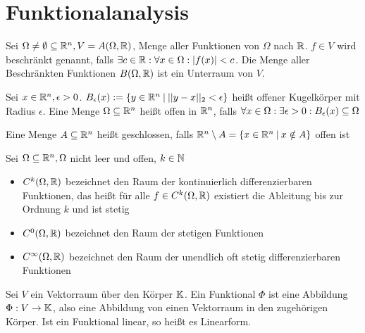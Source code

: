 \section{Funktionalanalysis}

\begin{definition}
	Sei $ \Omega \neq \emptyset \subseteq \mathbb{R}^n, V = A(\Omega,\mathbb{R})$, Menge aller Funktionen von $\Omega$ nach $\mathbb{R}$. $f \in V$ wird beschränkt genannt, falls $\exists c \in \mathbb{R} : \forall x \in \Omega : |f(x)| < c$. Die Menge aller Beschränkten Funktionen  $B(\Omega,\mathbb{R})$ ist ein Unterraum von $V$.
\end{definition}

\begin{definition}
	Sei $x \in \mathbb{R}^n, \epsilon > 0$. $B_\epsilon(x) := \{y \in \mathbb{R}^n \medspace | \medspace ||y-x||_2 < \epsilon \}$ heißt offener Kugelkörper mit Radius $\epsilon$. Eine Menge $\Omega \subseteq \mathbb{R}^n$ heißt offen in $\mathbb{R}^n$, falls $\forall x \in \Omega : \exists \epsilon > 0 : B_\epsilon(x) \subseteq \Omega$
\end{definition}

\begin{definition}
	Eine Menge $A \subseteq \mathbb{R}^n$ heißt geschlossen, falls $\mathbb{R}^n \setminus A = \{x \in \mathbb{R}^n \medspace | \medspace x \notin A \}$ offen ist
\end{definition}

\begin{definition}
	Sei $\Omega \subseteq \mathbb{R}^n, \Omega$ nicht leer und offen, $k \in \mathbb{N}$
	\begin{itemize}[noitemsep]
		\item $C^{k}(\Omega,\mathbb{R})$ bezeichnet den Raum der kontinuierlich differenzierbaren Funktionen, das heißt für alle $f \in C^{k}(\Omega,\mathbb{R})$ existiert die Ableitung bis zur Ordnung $k$ und ist stetig
		\item $C^{0}(\Omega,\mathbb{R})$ bezeichnet den Raum der stetigen Funktionen
		\item $C^{\infty}(\Omega,\mathbb{R})$ bezeichnet den Raum der unendlich oft stetig differenzierbaren Funktionen
	\end{itemize}
\end{definition}

\begin{definition}[Funktional]
	Sei $V$ ein Vektorraum über den Körper $\mathbb{K}$. Ein Funktional $\Phi$ ist eine Abbildung $\Phi : V \rightarrow \mathbb{K}$, also eine Abbildung von einen Vektorraum in den zugehörigen Körper. Ist ein Funktional linear, so heißt es Linearform.
\end{definition}



